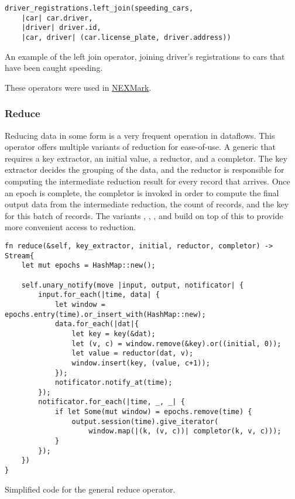 \begin{listing}[H]
\begin{verbatim}
driver_registrations.left_join(speeding_cars,
    |car| car.driver,
    |driver| driver.id,
    |car, driver| (car.license_plate, driver.address))
\end{verbatim}
\caption{An example of the left join operator, joining driver's registrations to cars that have been caught speeding.}
\label{lst:left-join-example}
\end{listing}

\noindent These operators were used in \hyperref[section:nexmark]{NEXMark}.

\subsubsection{Reduce}
Reducing data in some form is a very frequent operation in dataflows. This operator offers multiple variants of reduction for ease-of-use. A generic  that requires a key extractor, an initial value, a reductor, and a completor. The key extractor decides the grouping of the data, and the reductor is responsible for computing the intermediate reduction result for every record that arrives. Once an epoch is complete, the completor is invoked in order to compute the final output data from the intermediate reduction, the count of records, and the key for this batch of records. The variants , , , and  build on top of this to provide more convenient access to reduction.

\begin{listing}[H]
\begin{verbatim}
fn reduce(&self, key_extractor, initial, reductor, completor) -> Stream{
    let mut epochs = HashMap::new();

    self.unary_notify(move |input, output, notificator| {
        input.for_each(|time, data| {
            let window = epochs.entry(time).or_insert_with(HashMap::new);
            data.for_each(|dat|{
                let key = key(&dat);
                let (v, c) = window.remove(&key).or((initial, 0));
                let value = reductor(dat, v);
                window.insert(key, (value, c+1));
            });
            notificator.notify_at(time);
        });
        notificator.for_each(|time, _, _| {
            if let Some(mut window) = epochs.remove(time) {
                output.session(time).give_iterator(
                    window.map(|(k, (v, c))| completor(k, v, c)));
            }
        });
    })
}
\end{verbatim}
  \caption{Simplified code for the general reduce operator.}
  \label{lst:reduce}
\end{listing}


